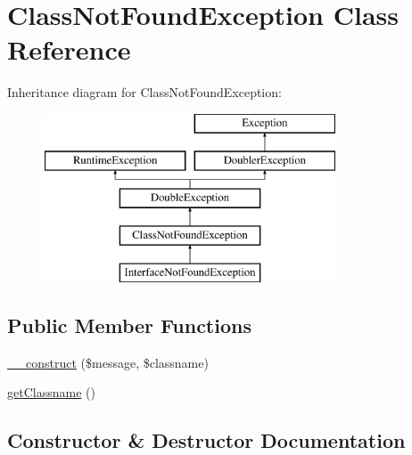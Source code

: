 \hypertarget{class_prophecy_1_1_exception_1_1_doubler_1_1_class_not_found_exception}{}\section{Class\+Not\+Found\+Exception Class Reference}
\label{class_prophecy_1_1_exception_1_1_doubler_1_1_class_not_found_exception}
Inheritance diagram for Class\+Not\+Found\+Exception\+:\begin{figure}[H]
\begin{center}
\leavevmode
\includegraphics[height=5.000000cm]{class_prophecy_1_1_exception_1_1_doubler_1_1_class_not_found_exception}
\end{center}
\end{figure}
\subsection*{Public Member Functions}
\begin{DoxyCompactItemize}
\item 
\mbox{\hyperlink{class_prophecy_1_1_exception_1_1_doubler_1_1_class_not_found_exception_ac6b617ef0fe20e9eaecffce7f98cb74e}{\+\_\+\+\_\+construct}} (\$message, \$classname)
\item 
\mbox{\hyperlink{class_prophecy_1_1_exception_1_1_doubler_1_1_class_not_found_exception_a2de0f0e912c2f4137ae5ce2687ef8fc5}{get\+Classname}} ()
\end{DoxyCompactItemize}


\subsection{Constructor \& Destructor Documentation}
\mbox{\label{class_prophecy_1_1_exception_1_1_doubler_1_1_class_not_found_exception_ac6b617ef0fe20e9eaecffce7f98cb74e}} 
